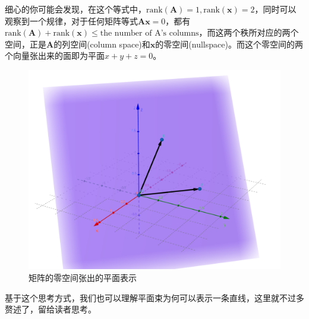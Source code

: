 细心的你可能会发现，在这个等式中，$\text{rank}(\mathbf{A})=1, \text{rank}(\mathbf{x})=2$，同时可以观察到一个规律，对于任何矩阵等式$\mathbf{Ax}=0$，都有$\text{rank}(\mathbf{A})+\text{rank}(\mathbf{x})\leq \text{the number of A's columns}$，而这两个秩所对应的两个空间，正是$\mathbf{A}$的列空间(column space)和$\mathbf{x}$的零空间(nullspace)。而这个零空间的两个向量张出来的面即为平面$x+y+z=0$。

\begin{figure}[H]
    \centering
    \centerline{\includegraphics[width=12cm]{figure/nullspace_for_2d_plane.png}}
    \caption{矩阵的零空间张出的平面表示} \label{nullspace}
\end{figure}

基于这个思考方式，我们也可以理解平面束为何可以表示一条直线，这里就不过多赘述了，留给读者思考。